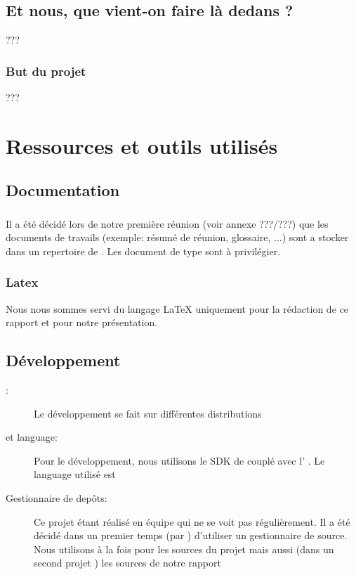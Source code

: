 \documentclass[french]{report}
\begin{document}
\section{Et nous, que vient-on faire là dedans ?}
???
\subsection{But du projet}
???


\chapter{Ressources et outils utilisés}
\section{Documentation}
\subsection{\googleDrive}
Il a été décidé lors de notre première réunion (voir annexe ???/???) que les documents de travails (exemple: résumé de réunion, glossaire, ...) sont a stocker dans un repertoire de \googleDrive{}. Les document de type \og{}\google{}\fg{} sont à privilégier.
\subsection{Latex}
Nous nous sommes servi du langage \LaTeX{} uniquement pour la rédaction de ce rapport et pour notre présentation.
\section{Développement}
\begin{description}
\item[\os{}: ] Le développement se fait sur différentes distributions \linux{}
\item[\ide{} et language: ] Pour le développement, nous utilisons le SDK de \android{} couplé avec l'\ide{} \eclipse{}. Le language utilisé est \java{}
\item[Gestionnaire de depôts: ] Ce projet étant réalisé en équipe qui ne se voit pas régulièrement. Il a été décidé dans un premier temps (par \responsableProjet{}) d'utiliser un gestionnaire de source. Nous utilisons \github{} à la fois pour les sources du projet mais aussi (dans un second projet \github{}) les sources de notre rapport
\end{description}
\end{document}
